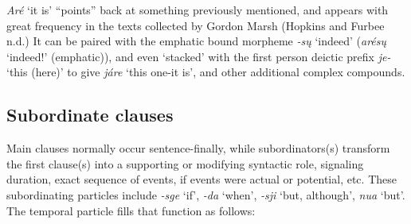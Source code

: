\documentclass[output=paper]{LSP/langsci}
\begin{document}
\begin{table}
\caption{Comparison of demonstrative pronouns to deictic directional prefixes} \label{demonstrative}
\end{table}

\textit{Ar\'e} `it is' ``points'' back at something previously mentioned, and appears with great frequency in the texts collected by Gordon Marsh (Hopkins and Furbee n.d.)  It can be paired with the emphatic bound morpheme \textit{-s\k{u}} `indeed' (\textit{ar\'es\k{u}} `indeed!' (emphatic)), and even `stacked' with the first person deictic prefix \textit{je-} `this (here)' to give \textit{j\'are} `this one-it is', and other additional complex compounds.    

\subsection{Subordinate clauses}
Main clauses normally occur sentence-finally, while subordinators(s) transform the first clause(s) into a supporting or modifying syntactic role, signaling duration, exact sequence of events, if events were actual or potential, etc. These subordinating particles include \textit{-sge} `if', \textit{-da} `when',  \textit{-sji}  `but, although', \textit{nua} `but'.   The temporal particle fills that function as follows:
\end{document}
